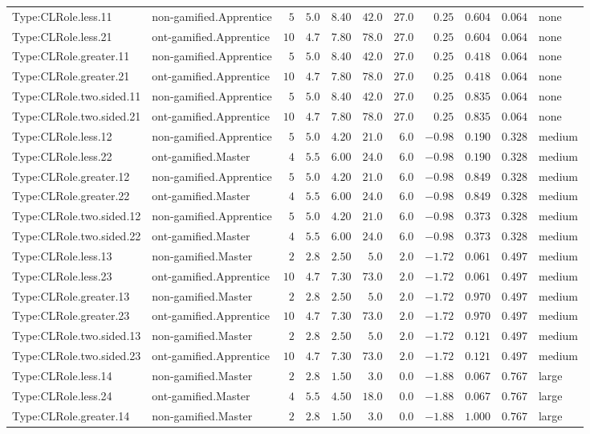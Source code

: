 \documentclass[6pt,a4paper]{article}
\begin{document}
{\begin{longtable}{llrrrrrrrrl}
Type:CLRole.less.11&non-gamified.Apprentice&$ 5$&$5.0$&$ 8.40$&$ 42.0$&$27.0$&$ 0.25$&$0.604$&$0.064$&none\tabularnewline
Type:CLRole.less.21&ont-gamified.Apprentice&$10$&$4.7$&$ 7.80$&$ 78.0$&$27.0$&$ 0.25$&$0.604$&$0.064$&none\tabularnewline
Type:CLRole.greater.11&non-gamified.Apprentice&$ 5$&$5.0$&$ 8.40$&$ 42.0$&$27.0$&$ 0.25$&$0.418$&$0.064$&none\tabularnewline
Type:CLRole.greater.21&ont-gamified.Apprentice&$10$&$4.7$&$ 7.80$&$ 78.0$&$27.0$&$ 0.25$&$0.418$&$0.064$&none\tabularnewline
Type:CLRole.two.sided.11&non-gamified.Apprentice&$ 5$&$5.0$&$ 8.40$&$ 42.0$&$27.0$&$ 0.25$&$0.835$&$0.064$&none\tabularnewline
Type:CLRole.two.sided.21&ont-gamified.Apprentice&$10$&$4.7$&$ 7.80$&$ 78.0$&$27.0$&$ 0.25$&$0.835$&$0.064$&none\tabularnewline
Type:CLRole.less.12&non-gamified.Apprentice&$ 5$&$5.0$&$ 4.20$&$ 21.0$&$ 6.0$&$-0.98$&$0.190$&$0.328$&medium\tabularnewline
Type:CLRole.less.22&ont-gamified.Master&$ 4$&$5.5$&$ 6.00$&$ 24.0$&$ 6.0$&$-0.98$&$0.190$&$0.328$&medium\tabularnewline
Type:CLRole.greater.12&non-gamified.Apprentice&$ 5$&$5.0$&$ 4.20$&$ 21.0$&$ 6.0$&$-0.98$&$0.849$&$0.328$&medium\tabularnewline
Type:CLRole.greater.22&ont-gamified.Master&$ 4$&$5.5$&$ 6.00$&$ 24.0$&$ 6.0$&$-0.98$&$0.849$&$0.328$&medium\tabularnewline
Type:CLRole.two.sided.12&non-gamified.Apprentice&$ 5$&$5.0$&$ 4.20$&$ 21.0$&$ 6.0$&$-0.98$&$0.373$&$0.328$&medium\tabularnewline
Type:CLRole.two.sided.22&ont-gamified.Master&$ 4$&$5.5$&$ 6.00$&$ 24.0$&$ 6.0$&$-0.98$&$0.373$&$0.328$&medium\tabularnewline
Type:CLRole.less.13&non-gamified.Master&$ 2$&$2.8$&$ 2.50$&$  5.0$&$ 2.0$&$-1.72$&$0.061$&$0.497$&medium\tabularnewline
Type:CLRole.less.23&ont-gamified.Apprentice&$10$&$4.7$&$ 7.30$&$ 73.0$&$ 2.0$&$-1.72$&$0.061$&$0.497$&medium\tabularnewline
Type:CLRole.greater.13&non-gamified.Master&$ 2$&$2.8$&$ 2.50$&$  5.0$&$ 2.0$&$-1.72$&$0.970$&$0.497$&medium\tabularnewline
Type:CLRole.greater.23&ont-gamified.Apprentice&$10$&$4.7$&$ 7.30$&$ 73.0$&$ 2.0$&$-1.72$&$0.970$&$0.497$&medium\tabularnewline
Type:CLRole.two.sided.13&non-gamified.Master&$ 2$&$2.8$&$ 2.50$&$  5.0$&$ 2.0$&$-1.72$&$0.121$&$0.497$&medium\tabularnewline
Type:CLRole.two.sided.23&ont-gamified.Apprentice&$10$&$4.7$&$ 7.30$&$ 73.0$&$ 2.0$&$-1.72$&$0.121$&$0.497$&medium\tabularnewline
Type:CLRole.less.14&non-gamified.Master&$ 2$&$2.8$&$ 1.50$&$  3.0$&$ 0.0$&$-1.88$&$0.067$&$0.767$&large\tabularnewline
Type:CLRole.less.24&ont-gamified.Master&$ 4$&$5.5$&$ 4.50$&$ 18.0$&$ 0.0$&$-1.88$&$0.067$&$0.767$&large\tabularnewline
Type:CLRole.greater.14&non-gamified.Master&$ 2$&$2.8$&$ 1.50$&$  3.0$&$ 0.0$&$-1.88$&$1.000$&$0.767$&large\tabularnewline

\end{longtable}}
\end{document}
